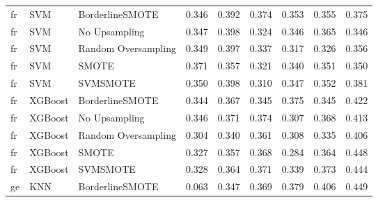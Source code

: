 \begin{tabular}{lllllllll}
      fr &                          SVM &     BorderlineSMOTE & 0.346 &                     0.392 &                 0.374 &                  0.353 &                                   0.355 &     0.375 \\
      fr &                          SVM &       No Upsampling & 0.347 &                     0.398 &                 0.324 &                  0.346 &                                   0.365 &     0.346 \\
      fr &                          SVM & Random Oversampling & 0.349 &                     0.397 &                 0.337 &                  0.317 &                                   0.326 &     0.356 \\
      fr &                          SVM &               SMOTE & 0.371 &                     0.357 &                 0.321 &                  0.340 &                                   0.351 &     0.350 \\
      fr &                          SVM &            SVMSMOTE & 0.350 &                     0.398 &                 0.310 &                  0.347 &                                   0.352 &     0.381 \\
      fr &                      XGBoost &     BorderlineSMOTE & 0.344 &                     0.367 &                 0.345 &                  0.375 &                                   0.345 &     0.422 \\
      fr &                      XGBoost &       No Upsampling & 0.346 &                     0.371 &                 0.374 &                  0.307 &                                   0.368 &     0.413 \\
      fr &                      XGBoost & Random Oversampling & 0.304 &                     0.340 &                 0.361 &                  0.308 &                                   0.335 &     0.406 \\
      fr &                      XGBoost &               SMOTE & 0.327 &                     0.357 &                 0.368 &                  0.284 &                                   0.364 &     0.448 \\
      fr &                      XGBoost &            SVMSMOTE & 0.328 &                     0.364 &                 0.371 &                  0.339 &                                   0.373 &     0.444 \\
      ge &                          KNN &     BorderlineSMOTE & 0.063 &                     0.347 &                 0.369 &                  0.379 &                                   0.406 &     0.449 \\

\end{tabular}
